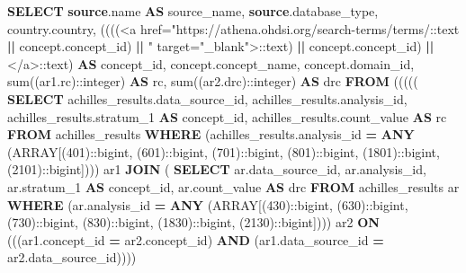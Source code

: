 \documentclass[
]{book}
\newenvironment{Shaded}{\begin{snugshade}}{\end{snugshade}}
\newcommand{\CharTok}[1]{\textcolor[rgb]{0.31,0.60,0.02}{#1}}
\newcommand{\DataTypeTok}[1]{\textcolor[rgb]{0.13,0.29,0.53}{#1}}
\newcommand{\DecValTok}[1]{\textcolor[rgb]{0.00,0.00,0.81}{#1}}
\newcommand{\FunctionTok}[1]{\textcolor[rgb]{0.00,0.00,0.00}{#1}}
\newcommand{\KeywordTok}[1]{\textcolor[rgb]{0.13,0.29,0.53}{\textbf{#1}}}
\newcommand{\NormalTok}[1]{#1}
\newcommand{\OperatorTok}[1]{\textcolor[rgb]{0.81,0.36,0.00}{\textbf{#1}}}
\newcommand{\StringTok}[1]{\textcolor[rgb]{0.31,0.60,0.02}{#1}}
\begin{document}
\begin{Shaded}
\begin{Highlighting}[]
\KeywordTok{SELECT} \KeywordTok{source}\NormalTok{.name }\KeywordTok{AS}\NormalTok{ source\_name,}
   \KeywordTok{source}\NormalTok{.database\_type,}
\NormalTok{   country.country,}
\NormalTok{   ((((}\StringTok{\textquotesingle{}\textless{}a href="https://athena.ohdsi.org/search{-}terms/terms/\textquotesingle{}}\NormalTok{:}\CharTok{:text} \OperatorTok{||}\NormalTok{ concept.concept\_id) }\OperatorTok{||} \StringTok{\textquotesingle{}" target="\_blank"\textgreater{}\textquotesingle{}}\NormalTok{:}\CharTok{:text}\NormalTok{) }\OperatorTok{||}\NormalTok{ concept.concept\_id) }\OperatorTok{||} \StringTok{\textquotesingle{}\textless{}/a\textgreater{}\textquotesingle{}}\NormalTok{:}\CharTok{:text}\NormalTok{) }\KeywordTok{AS}\NormalTok{ concept\_id,}
\NormalTok{   concept.concept\_name,}
\NormalTok{   concept.domain\_id,}
   \FunctionTok{sum}\NormalTok{((ar1.rc):}\CharTok{:integer}\NormalTok{) }\KeywordTok{AS}\NormalTok{ rc,}
   \FunctionTok{sum}\NormalTok{((ar2.drc):}\CharTok{:integer}\NormalTok{) }\KeywordTok{AS}\NormalTok{ drc}
  \KeywordTok{FROM}\NormalTok{ ((((( }\KeywordTok{SELECT}\NormalTok{ achilles\_results.data\_source\_id,}
\NormalTok{           achilles\_results.analysis\_id,}
\NormalTok{           achilles\_results.stratum\_1 }\KeywordTok{AS}\NormalTok{ concept\_id,}
\NormalTok{           achilles\_results.count\_value }\KeywordTok{AS}\NormalTok{ rc}
          \KeywordTok{FROM}\NormalTok{ achilles\_results}
         \KeywordTok{WHERE}\NormalTok{ (achilles\_results.analysis\_id }\OperatorTok{=} \KeywordTok{ANY}\NormalTok{ (}\DataTypeTok{ARRAY}\NormalTok{[(}\DecValTok{401}\NormalTok{):}\CharTok{:bigint}\NormalTok{, (}\DecValTok{601}\NormalTok{):}\CharTok{:bigint}\NormalTok{, (}\DecValTok{701}\NormalTok{):}\CharTok{:bigint}\NormalTok{, (}\DecValTok{801}\NormalTok{):}\CharTok{:bigint}\NormalTok{, (}\DecValTok{1801}\NormalTok{):}\CharTok{:bigint}\NormalTok{, (}\DecValTok{2101}\NormalTok{):}\CharTok{:bigint}\NormalTok{]))) ar1}
    \KeywordTok{JOIN}\NormalTok{ ( }\KeywordTok{SELECT}\NormalTok{ ar.data\_source\_id,}
\NormalTok{           ar.analysis\_id,}
\NormalTok{           ar.stratum\_1 }\KeywordTok{AS}\NormalTok{ concept\_id,}
\NormalTok{           ar.count\_value }\KeywordTok{AS}\NormalTok{ drc}
          \KeywordTok{FROM}\NormalTok{ achilles\_results ar}
         \KeywordTok{WHERE}\NormalTok{ (ar.analysis\_id }\OperatorTok{=} \KeywordTok{ANY}\NormalTok{ (}\DataTypeTok{ARRAY}\NormalTok{[(}\DecValTok{430}\NormalTok{):}\CharTok{:bigint}\NormalTok{, (}\DecValTok{630}\NormalTok{):}\CharTok{:bigint}\NormalTok{, (}\DecValTok{730}\NormalTok{):}\CharTok{:bigint}\NormalTok{, (}\DecValTok{830}\NormalTok{):}\CharTok{:bigint}\NormalTok{, (}\DecValTok{1830}\NormalTok{):}\CharTok{:bigint}\NormalTok{, (}\DecValTok{2130}\NormalTok{):}\CharTok{:bigint}\NormalTok{]))) ar2 }\KeywordTok{ON}\NormalTok{ (((ar1.concept\_id }\OperatorTok{=}\NormalTok{ ar2.concept\_id) }\KeywordTok{AND}\NormalTok{ (ar1.data\_source\_id }\OperatorTok{=}\NormalTok{ ar2.data\_source\_id))))}

\end{Highlighting}
\end{Shaded}
\end{document}
